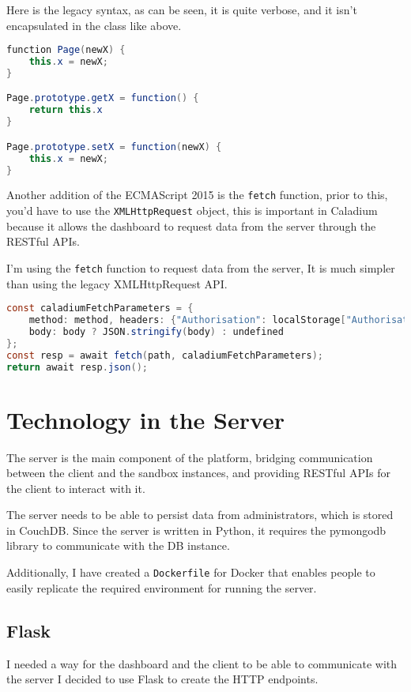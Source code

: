 Here is the legacy syntax, as can be seen, it is quite verbose,
and it isn't encapsulated in the class like above.

\begin{lstlisting}[language=Java]
function Page(newX) {
    this.x = newX;
}

Page.prototype.getX = function() {
    return this.x
}

Page.prototype.setX = function(newX) {
    this.x = newX;
}
\end{lstlisting}

Another addition of the ECMAScript 2015 is the \texttt{fetch} function,
prior to this, you'd have to use the \texttt{XMLHttpRequest} object,
this is important in Caladium because it allows the dashboard to
request data from the server through the RESTful APIs.

I'm using the \texttt{fetch} function to request data from the server,
It is much simpler than using the legacy XMLHttpRequest API.

\begin{lstlisting}[language=Java]
const caladiumFetchParameters = {
    method: method, headers: {"Authorisation": localStorage["Authorisation"]},
    body: body ? JSON.stringify(body) : undefined
};
const resp = await fetch(path, caladiumFetchParameters);
return await resp.json();
\end{lstlisting}

\section{Technology in the Server}
The server is the main component of the platform,
bridging communication between the client and the sandbox instances, 
and providing RESTful APIs for the client to interact with it.

The server needs to be able to persist data from administrators, 
which is stored in CouchDB. Since the server is written in Python,
it requires the pymongodb library to communicate with the DB instance.

Additionally, I have created a \texttt{Dockerfile} for Docker
that enables people to easily replicate the required
environment for running the server.

\subsection{Flask}
I needed a way for the dashboard and the client to be
able to communicate with the server
I decided to use Flask to create the HTTP endpoints.

